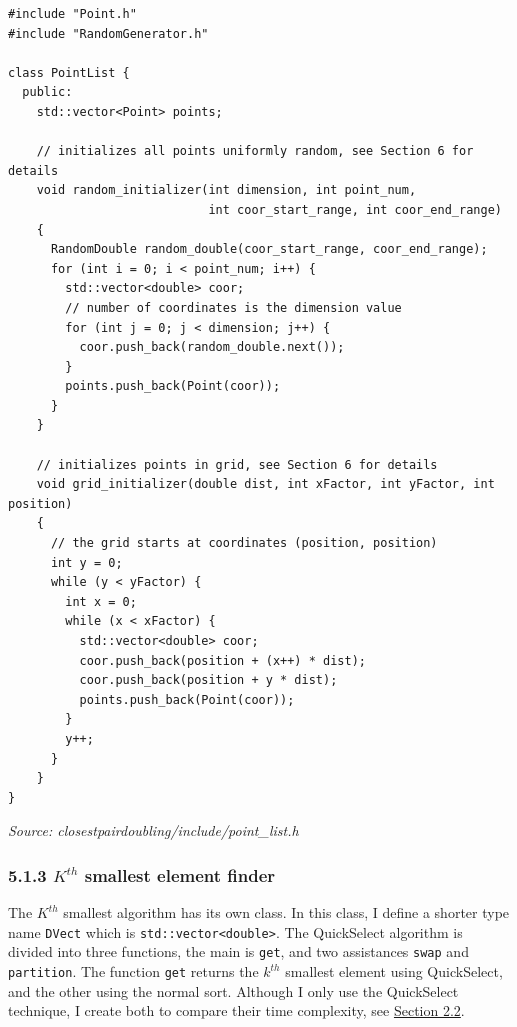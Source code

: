 \documentclass[12pt,english,]{article}
\newcommand{\code}[1]{\colorbox{light-gray}{\texttt{#1}}}
\begin{document}
\begin{lstlisting}
#include "Point.h"
#include "RandomGenerator.h"

class PointList {
  public:
    std::vector<Point> points;

    // initializes all points uniformly random, see Section 6 for details 
    void random_initializer(int dimension, int point_num,
                            int coor_start_range, int coor_end_range)
    {
      RandomDouble random_double(coor_start_range, coor_end_range);
      for (int i = 0; i < point_num; i++) {
        std::vector<double> coor;
        // number of coordinates is the dimension value
        for (int j = 0; j < dimension; j++) {
          coor.push_back(random_double.next());
        }
        points.push_back(Point(coor));
      }
    }

    // initializes points in grid, see Section 6 for details 
    void grid_initializer(double dist, int xFactor, int yFactor, int position)
    {
      // the grid starts at coordinates (position, position)
      int y = 0;
      while (y < yFactor) {
        int x = 0;
        while (x < xFactor) {
          std::vector<double> coor;
          coor.push_back(position + (x++) * dist);
          coor.push_back(position + y * dist);
          points.push_back(Point(coor));
        }
        y++;
      }
    }
}
\end{lstlisting}
\vspace{-9truemm}
\begin{minipage}{1\textwidth}
  \begin{flushright}
  {\footnotesize \emph{Source: closestpairdoubling/include/point\_list.h}\par}
  \end{flushright}
\end{minipage}

\hypertarget{section5.1.3}{%
\subsubsection{\texorpdfstring{5.1.3 \(K^{th}\) smallest element
finder}{5.1.3 K\^{}\{th\} smallest element finder}}\label{section5.1.3}}

The \(K^{th}\) smallest algorithm has its own class. In this class, I
define a shorter type name \code{DVect} which is
\code{std::vector<double>}. The QuickSelect algorithm is divided into
three functions, the main is \code{get}, and two assistances \code{swap}
and \code{partition}. The function \code{get} returns the \(k^{th}\)
smallest element using QuickSelect, and the other using the normal sort.
Although I only use the QuickSelect technique, I create both to compare
their time complexity, see \protect\hyperlink{section2.2}{Section 2.2}.
\end{document}
